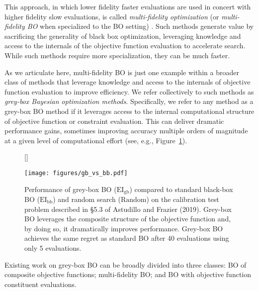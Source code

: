 \documentclass{wscpaperproc}
\newcommand{\EI}{\mathrm{EI}}
\newcommand{\savelength}[1]{} %
\theoremstyle{wsc}
\begin{document}
This approach, in which lower fidelity faster evaluations are used in concert with higher fidelity slow evaluations, is called {\it multi-fidelity  optimization} (or \textit{multi-fidelity  BO} when specialized to the BO setting) .
Such methods generate value by sacrificing the generality of black box optimization, leveraging knowledge and access to the internals of the objective function evaluation to \savelength{significantly} accelerate search. While such methods require more specialization, they can be much faster.


As we articulate here, multi-fidelity BO is just one example within a broader class of methods that leverage knowledge and access to the internals of objective function evaluation to improve efficiency. We refer collectively to such methods as {\it grey-box Bayesian optimization methods}.
Specifically, we refer to any method as a grey-box BO method if it leverages access to the internal computational structure of objective function or constraint evaluation. 
This can deliver dramatic performance gains, sometimes 
improving accuracy multiple orders of magnitude
 at a given level of computational effort (see, e.g., Figure~\ref{fig:gbei_vs_bbei}).
 
 \begin{figure}[h]
[\FBwidth]
{\caption{
Performance of  grey-box BO  ($\EI_{\mathrm{gb}}$) compared to standard black-box BO ($\EI_{\mathrm{bb}}$) and random search ($\mathrm{Random}$)  on the  calibration test problem described in \S5.3 of Astudillo and Frazier (2019). Grey-box BO leverages the composite structure of the objective function and, by doing so, it dramatically improves performance. Grey-box BO achieves the same regret as standard BO after 40 evaluations using only 5 evaluations. 
\label{fig:gbei_vs_bbei}}}
{\texttt{[image: figures/gb\_vs\_bb.pdf]}}
\end{figure}

Existing work on grey-box BO can be broadly divided into three classes: BO of composite objective functions; multi-fidelity BO; and BO with objective function constituent evaluations. 
\end{document}
